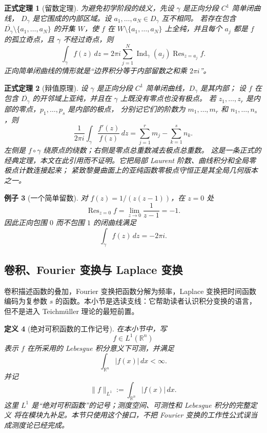 \documentclass[UTF8,fontset=none,a4paper,11pt]{ctexart}
\theoremstyle{foundation-definition}
\newtheorem{definition}{定义}[section]
\theoremstyle{foundation-theorem}
\newtheorem{theorem}[definition]{正式定理}
\theoremstyle{foundation-proposition}
\theoremstyle{foundation-example}
\newtheorem{example}[definition]{例子}
\theoremstyle{foundation-remark}
\theoremstyle{foundation-theorem}
\begin{document}
\begin{theorem}[留数定理]
为避免初学阶段的歧义，先设 \(\gamma\) 是正向分段 \(C^1\) 简单闭曲线，
\(D_\gamma\) 是它围成的内部区域。设 \(a_1,\ldots,a_N\in D_\gamma\) 互不相同。
若存在包含 \(\overline{D_\gamma}\setminus\{a_1,\ldots,a_N\}\) 的开集 \(W\)，使
\(f\) 在 \(W\setminus\{a_1,\ldots,a_N\}\) 上全纯，并且每个 \(a_j\) 都是
\(f\) 的孤立奇点，且 \(\gamma\) 不经过奇点，则
\[
\int_{\gamma}f(z)\,dz
=2\pi i\sum_{j=1}^{N}\operatorname{Ind}_{\gamma}(a_j)
\operatorname{Res}_{z=a_j}f.
\]
正向简单闭曲线的情形就是“边界积分等于内部留数之和乘 \(2\pi i\)”。
\end{theorem}

\begin{theorem}[辩值原理]\label{thm:argument-principle}
设 \(\gamma\) 是正向分段 \(C^1\) 简单闭曲线，\(D_\gamma\) 是其内部；
设 \(f\) 在包含 \(\overline{D_\gamma}\) 的开邻域上亚纯，并且在 \(\gamma\) 上既没有零点也没有极点。
若 \(z_1,\ldots,z_r\) 是内部的零点，\(p_1,\ldots,p_s\) 是内部的极点，
分别记它们的阶数为 \(m_1,\ldots,m_r\) 和 \(n_1,\ldots,n_s\)，则
\[
\frac{1}{2\pi i}\int_\gamma \frac{f'(z)}{f(z)}\,dz
=\sum_{j=1}^{r}m_j-\sum_{k=1}^{s}n_k.
\]
左侧是 \(f\circ\gamma\) 绕原点的绕数；右侧是零点总重数减去极点总重数。
这是一条正式的经典定理，本文在此引用而不证明。它把局部 Laurent 阶数、曲线积分和全局零极点计数连接起来；
紧致黎曼曲面上的亚纯函数零极点守恒正是其全局几何版本之一。
\end{theorem}

\begin{example}[一个简单留数]
对 \(f(z)=1/(z(z-1))\)，在 \(z=0\) 处
\[
\operatorname{Res}_{z=0}f
=\lim_{z\to0}\frac{1}{z-1}=-1.
\]
因此正向包围 \(0\) 而不包围 \(1\) 的闭曲线满足
\[
\int_{\gamma}f(z)\,dz=-2\pi i.
\]
\end{example}

\subsection{卷积、Fourier 变换与 Laplace 变换}

卷积描述函数的叠加，Fourier 变换把函数分解为频率，Laplace 变换把时间函数编码为复参数 \(s\) 的函数。本小节是选读支线：它帮助读者认识积分变换的语言，但不是进入 Teichmüller 理论的最短前置。

\begin{definition}[绝对可积函数的工作记号]\label{def:l1-integrability}
在本小节中，写
\[
  f\in L^1(\mathbb R^n)
\]
表示 \(f\) 在所采用的 Lebesgue 积分意义下可测，并满足
\[
  \int_{\mathbb R^n}|f(x)|\,dx<\infty.
\]
并记
\[
  \|f\|_{L^1}:=\int_{\mathbb R^n}|f(x)|\,dx.
\]
这里 \(L^1\) 是“绝对可积函数”的记号；测度空间、可测性和 Lebesgue 积分的完整定义
将在模块九补足。本节只使用这个接口，不把 Fourier 变换的工作性公式误当成测度论已经完成。
\end{definition}
\end{document}
